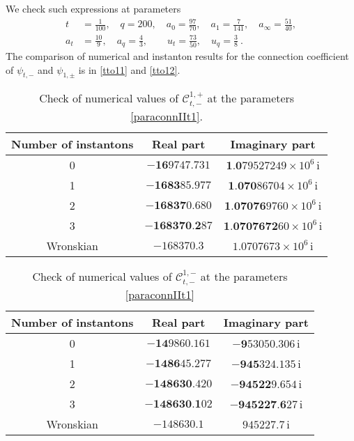 \documentclass[11pt]{article}
\numberwithin{equation}{section}
\begin{document}
We check such expressions
at parameters 
\begin{equation}\label{paraconnIIt1}
\begin{aligned}
t&=\frac{1}{100},\quad
q=200,\quad
a_0=\frac{97}{70},\quad
a_1=\frac{7}{141},\quad
a_{\infty}=\frac{51}{40},\\
a_t&=\frac{10}{9},\quad
a_{q}=\frac{4}{3},\quad\quad
u_t=\frac{73}{50},\quad
u_{q}=\frac{3}{8}\ .
\end{aligned}
\end{equation}
%
The comparison of numerical and instanton results for the connection coefficient of $\psi_{t,-}$ and $\psi_{1,\pm}$ is in \autoref{tto11} and \autoref{tto12}.
\begin{table}
    \centering
 \begin{tabular}{| c | c  c| }
    \hline
     Number of instantons & Real part  & Imaginary part  \\

    \hline   

    0  & $-\textbf{16}9747.731$  & $\textbf{1.0}79527249\times 10^6$\,i  \\
        
    1  & $-\textbf{1683}85.977$  & $\textbf{1.070}86704\times 10^6$\,i  \\

    2  & $-\textbf{16837}0.680$  & $\textbf{1.07076}9760\times 10^6$\,i \\

    3  & $-\textbf{168370.2}87$  & $\textbf{1.0707672}60\times 10^6$\,i \\
         \hline

    Wronskian & $-168370.3$  &  $1.0707673\times 10^6$\,i \\
         \hline
    \end{tabular}
    \caption{Check of numerical values of $\mathcal{C}_{t,-}^{1,+}$ at the parameters \eqref{paraconnIIt1}. }
    \label{tto11}
\end{table}
\begin{table}
    \centering
 \begin{tabular}{| c | c  c| }
    \hline
     Number of instantons & Real part  & Imaginary part  \\

    \hline   

    0  & $-\textbf{14}9860.161$  & $-\textbf{9}53050.306$\,i  \\
        
    1  & $-\textbf{1486}45.277$  & $-\textbf{945}324.135$\,i  \\

    2  & $-\textbf{148630}.420$  & $-\textbf{94522}9.654 $\,i \\
    3  & $-\textbf{148630.1}02$  & $-\textbf{945227.6}27$\,i \\
         \hline
    Wronskian & $-148630.1$  &  $945227.7$\,i \\
        \hline
    \end{tabular}
    \caption{Check of numerical values of $\mathcal{C}_{t,-}^{1,-}$ at the parameters \eqref{paraconnIIt1}}
    \label{tto12}
\end{table}
\end{document}
